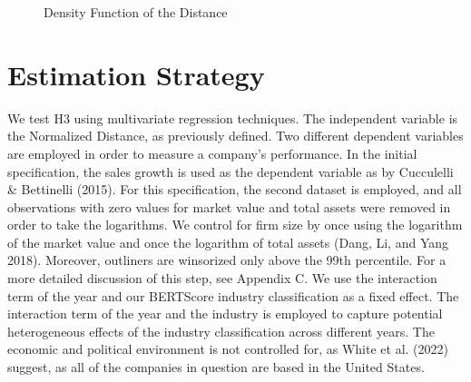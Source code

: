 \documentclass[
]{article}
\begin{document}
\begin{figure}


\caption{\label{fig-1}Density Function of the Distance}

\end{figure}%

\section{Estimation Strategy}\label{estimation-strategy}

We test H3 using multivariate regression techniques. The independent
variable is the Normalized Distance, as previously defined. Two
different dependent variables are employed in order to measure a
company's performance. In the initial specification, the sales growth is
used as the dependent variable as by Cucculelli \& Bettinelli (2015).
For this specification, the second dataset is employed, and all
observations with zero values for market value and total assets were
removed in order to take the logarithms. We control for firm size by
once using the logarithm of the market value and once the logarithm of
total assets (Dang, Li, and Yang 2018). Moreover, outliners are
winsorized only above the 99th percentile. For a more detailed
discussion of this step, see Appendix C. We use the interaction term of
the year and our BERTScore industry classification as a fixed effect.
The interaction term of the year and the industry is employed to capture
potential heterogeneous effects of the industry classification across
different years. The economic and political environment is not
controlled for, as White et al. (2022) suggest, as all of the companies
in question are based in the United States.
\end{document}
